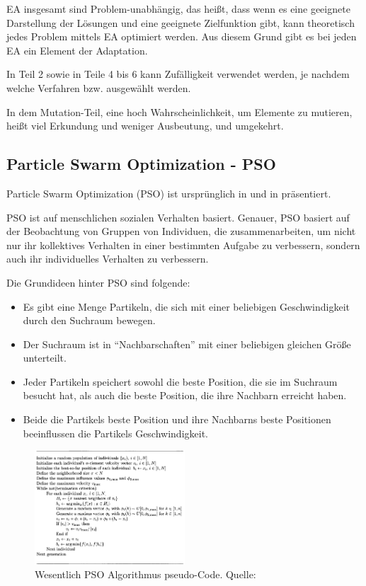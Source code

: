 \documentclass[twoside,twocolumn]{article}
\begin{document}
EA insgesamt sind Problem-unabhängig, das heißt, dass wenn es eine geeignete Darstellung der Lösungen und eine geeignete Zielfunktion gibt, kann theoretisch jedes Problem mittels EA optimiert werden. Aus diesem Grund gibt es bei jeden EA ein Element der Adaptation.\par
In Teil 2 sowie in Teile 4 bis 6 kann Zufälligkeit verwendet werden, je nachdem welche Verfahren bzw. ausgewählt werden.\par
In dem Mutation-Teil, eine hoch Wahrscheinlichkeit, um Elemente zu mutieren, heißt viel Erkundung und weniger Ausbeutung, und umgekehrt.

\subsection{Particle Swarm Optimization - PSO}
Particle Swarm Optimization (PSO) ist ursprünglich in \cite{kennedy_pso} und in \cite{shi_pso} präsentiert.\par
PSO ist auf menschlichen sozialen Verhalten basiert. \cite{eberhart_pso} Genauer,  PSO basiert auf der Beobachtung von Gruppen von Individuen, die zusammenarbeiten, um nicht nur ihr kollektives Verhalten in einer bestimmten Aufgabe zu verbessern, sondern auch ihr individuelles Verhalten zu verbessern.\par
Die Grundideen hinter PSO sind folgende:

\begin{itemize}
\item Es gibt eine Menge Partikeln, die sich mit einer beliebigen Geschwindigkeit durch den Suchraum bewegen.
\item Der Suchraum ist in \enquote{Nachbarschaften} mit einer beliebigen gleichen Größe unterteilt.
\item Jeder Partikeln speichert sowohl die beste Position, die sie im Suchraum besucht hat, als auch die beste Position, die ihre Nachbarn erreicht haben.
\item Beide die Partikels beste Position und ihre Nachbarns beste Positionen beeinflussen die Partikels Geschwindigkeit.
\end{itemize}

\begin{figure}[h]
\caption{Wesentlich PSO Algorithmus pseudo-Code. Quelle: \cite{wiley_evolutionary}}
\label{fig:pso_pseudo}
\centering
\includegraphics[width=0.5\textwidth]{images/pso_pseudo.png}
\end{figure}
\end{document}
